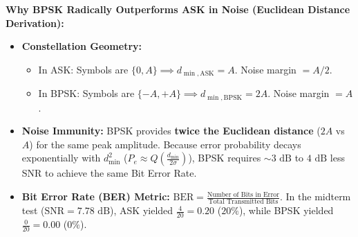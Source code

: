\documentclass[10pt,a4paper]{article}
\begin{document}
\begin{tcolorbox}[
    colframe=accentgreen,
    colback=white,
    arc=1.2mm,
    boxrule=0.5pt,
    left=5pt, right=5pt, top=2.5pt, bottom=2.5pt
]
\textbf{Why BPSK Radically Outperforms ASK in Noise (Euclidean Distance Derivation):}
\begin{itemize}[leftmargin=10pt, itemsep=1pt, topsep=1pt]
    \item \textbf{Constellation Geometry:}
    \begin{itemize}[leftmargin=8pt, itemsep=0.5pt]
        \item In ASK: Symbols are $\{0, A\} \implies d_{\min, \text{ASK}} = A$. Noise margin $= A/2$.
        \item In BPSK: Symbols are $\{-A, +A\} \implies d_{\min, \text{BPSK}} = 2A$. Noise margin $= A$.
    \end{itemize}
    \item \textbf{Noise Immunity:} BPSK provides \textbf{twice the Euclidean distance} ($2A$ vs $A$) for the same peak amplitude. Because error probability decays exponentially with $d_{\min}^2$ ($P_e \approx Q\left(\frac{d_{\min}}{2\sigma}\right)$), BPSK requires $\sim 3\text{ dB}$ to $4\text{ dB}$ less SNR to achieve the same Bit Error Rate.
    \item \textbf{Bit Error Rate (BER) Metric:} $\text{BER} = \frac{\text{Number of Bits in Error}}{\text{Total Transmitted Bits}}$.
    In the midterm test ($\text{SNR} = 7.78\text{ dB}$), ASK yielded $\frac{4}{20} = 0.20$ ($20\%$), while BPSK yielded $\frac{0}{20} = 0.00$ ($0\%$).
\end{itemize}
\end{tcolorbox}

\vspace{2pt}

\clearpage
\par\vspace{2pt}
\end{document}
